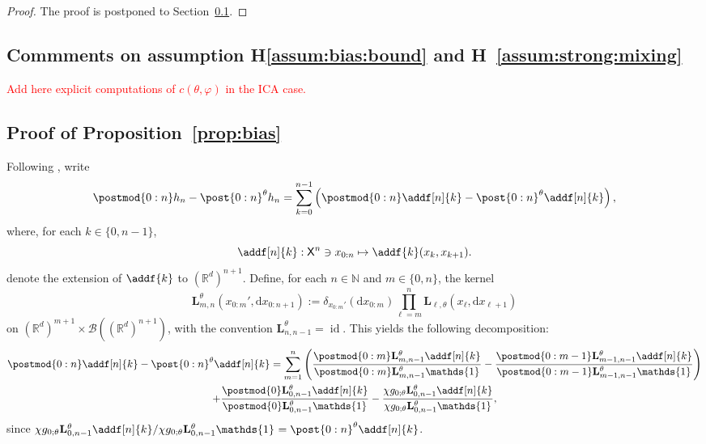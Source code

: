 \documentclass{article}
\newcommand{\intvect}[2]{\{ #1, #2 \}}
\newcommand{\nset}{\mathbb{N}}
\newcommand{\1}{\mathbbm{1}}
\newcommand{\uk}[1]{\mathbf{L}_{#1}}
\newcommand{\Xset}{\mathsf{X}}
\newcommand{\md}[1]{g_{#1}}
\newcommand{\parvec}{\theta}
\def\1{\mathds{1}}
\newcommand{\rmd}{\ensuremath{\mathrm{d}}}
\newcommand{\eqdef}{\ensuremath{:=}}
\begin{document}
\begin{proof}
The proof is postponed to Section~\ref{sec:assumptions}.
\end{proof}

\subsection{Commments on assumption H\ref{assum:bias:bound} and H~\ref{assum:strong:mixing}}
\label{sec:assumptions}
\textcolor{red}{Add here explicit computations of $c(\theta,\varphi)$ in the ICA case.}

\subsection{Proof of Proposition~\ref{prop:bias}}
\label{sec:proof}
Following \cite{gloaguen2019pseudo}, write 
$$
\postmod{0:n} h_n - \post{0:n}^\theta h_n = \sum_{k = 0}^{n - 1} \left( \postmod{0:n} \addf[n]{k} - \post{0:n}^\theta \addf[n]{k} \right), 
$$
where, for each $k \in \intvect{0}{n - 1}$, 
\begin{equation} \label{eq:def:addf}
\addf[n]{k} : \Xset^n \ni x_{0:n} \mapsto \addf{k}(x_k, x_{k + 1}) .
\end{equation}
denote the extension of $\addf{k}$ to $(\mathbb{R}^d)^{n+1}$. Define, for each $n \in \nset$ and $m \in \intvect{0}{n}$, the kernel 
\begin{equation} \label{eq:def:uk:products}
    \uk{m, n}^\theta(x_{0:m}', \rmd x_{0:n + 1}) \eqdef \delta_{x_{0:m}'}(\rmd x_{0:m}) \prod_{\ell = m}^n \uk{\ell,\theta}(x_\ell, \rmd x_{\ell + 1}) 
\end{equation}
on $(\mathbb{R}^d)^{m+1} \times \mathcal{B}((\mathbb{R}^d)^{n + 1})$, with the convention $\uk{n, n - 1}^\theta = \operatorname{id}$.  This yields the following decomposition:
\begin{multline*}
\postmod{0:n} \addf[n]{k} - \post{0:n}^\theta \addf[n]{k} = 
\sum_{m = 1}^n \left( \frac{\postmod{0:m} \uk{m, n - 1}^\theta \addf[n]{k}}{\postmod{0:m} \uk{m, n - 1}^\theta \1_{}} - \frac{\postmod{0:m - 1} \uk{m - 1, n - 1}^\theta \addf[n]{k}}{\postmod{0:m - 1} \uk{m - 1, n - 1}^\theta \1_{}} \right) \\ + \frac{\postmod{0} \uk{0, n - 1}^\theta \addf[n]{k}}{\postmod{0} \uk{0, n - 1}^\theta \1_{}} - \frac{\chi \md{0;\parvec}\uk{0, n - 1}^\theta \addf[n]{k}}{\chi\md{0;\parvec}\uk{0, n - 1}^\theta \1_{}},
\end{multline*}
since $\chi \md{0;\parvec} \uk{0, n - 1}^\theta \addf[n]{k}/\chi\md{0;\parvec}\uk{0, n - 1}^\theta \1_{} = \post{0:n}^\theta \addf[n]{k}$.
\end{document}
